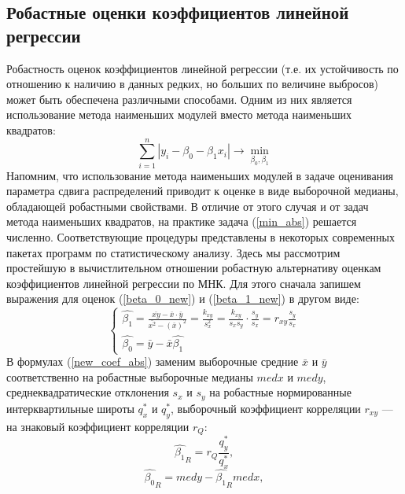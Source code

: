 \documentclass[a4paper,14pt]{article}
\begin{document}
	\subsection{Робастные оценки коэффициентов линейной регрессии}
	\noindent Робастность оценок коэффициентов линейной регрессии (т.е. их устойчивость по отношению к наличию в данных редких, но больших по величине выбросов) может быть обеспечена различными способами. Одним из них является использование метода наименьших модулей вместо метода наименьших квадратов:
	\begin{equation}
		\sum_{i=1}^{n}{|y_{i} - \beta_{0} - \beta_{1}x_{i}|}\rightarrow \min_{\beta_{0}, \beta_{1}}
		\label{min_abs}
	\end{equation}
	Напомним, что использование метода наименьших модулей в задаче оценивания параметра сдвига распределений приводит к оценке в виде выборочной медианы, обладающей робастными свойствами. В отличие от этого случая и от задач метода наименьших квадратов, на практике задача (\ref{min_abs}) решается численно. Соответствующие процедуры представлены в некоторых современных пакетах программ по статистическому анализу.
	\newline
	Здесь мы рассмотрим простейшую в вычистлительном отношении робастную альтернативу оценкам коэффициентов линейной регрессии по МНК. Для этого сначала запишем выражения для оценок (\ref{beta_0_new}) и (\ref{beta_1_new}) в другом виде:
	\begin{equation}
		\begin{cases}
			\hat{\beta_{1}} = \frac{\bar{xy} - \bar{x} \cdot \bar{y}}{\bar{x^{2}} - (\bar{x})^{2}} = \frac{k_{xy}}{s_{x}^{2}} = \frac{k_{xy}}{s_{x}s_{y}} \cdot \frac{s_{y}}{s_{x}} = r_{xy}\frac{s_{y}}{s_{x}} \\         
			\hat{\beta_{0}} = \bar{y} - \bar{x}\hat{\beta_{1}}
		\end{cases}
		\label{new_coef_abs}
	\end{equation}
	В формулах (\ref{new_coef_abs}) заменим выборочные средние $\bar{x}$ и $\bar{y}$ соответственно на робастные выборочные медианы $med x$ и $med y$, среднеквадратические отклонения $s_{x}$ и $s_{y}$ на робастные нормированные интерквартильные широты $q^{*}_{x}$ и $q^{*}_{y}$, выборочный коэффициент корреляции $r_{xy}$ — на знаковый коэффициент корреляции $r_{Q}$: 
	\begin{equation}
		\hat{\beta_{1}}_{R} = r_{Q}\frac{q^{*}_{y}}{q^{*}_{x}},
		\label{b_1R}
	\end{equation}
	\begin{equation}
		\hat{\beta_{0}}_{R} = med y - \hat{\beta_{1}}_{R} med x,
		\label{b_0R}
	\end{equation}
\end{document}
